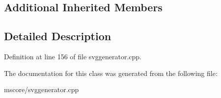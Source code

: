 \subsection*{Additional Inherited Members}


\subsection{Detailed Description}


Definition at line 156 of file svggenerator.\+cpp.



The documentation for this class was generated from the following file\+:\begin{DoxyCompactItemize}
\item 
mscore/svggenerator.\+cpp\end{DoxyCompactItemize}
